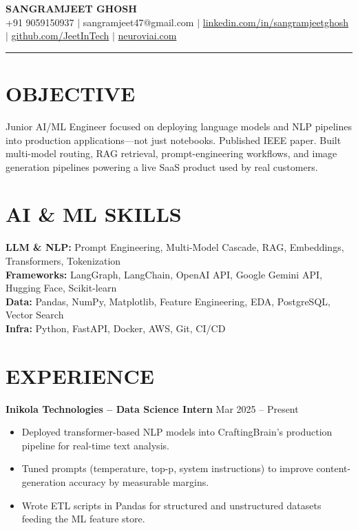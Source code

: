 \documentclass[10pt]{article}
\begin{document}
\begin{center}
{\Large \textbf{SANGRAMJEET GHOSH}} \\[2pt]
{\small +91 9059150937 $|$ sangramjeet47@gmail.com $|$
\href{https://www.linkedin.com/in/sangramjeetghosh}{linkedin.com/in/sangramjeetghosh} $|$
\href{https://github.com/JeetInTech}{github.com/JeetInTech} $|$
\href{https://neuroviai.com}{neuroviai.com}}
\end{center}

\noindent\rule{\textwidth}{0.4pt}

\section*{OBJECTIVE}
Junior AI/ML Engineer focused on deploying language models and NLP pipelines into production applications---not just notebooks. Published IEEE paper. Built multi-model routing, RAG retrieval, prompt-engineering workflows, and image generation pipelines powering a live SaaS product used by real customers.

\section*{AI \& ML SKILLS}
\textbf{LLM \& NLP:} Prompt Engineering, Multi-Model Cascade, RAG, Embeddings, Transformers, Tokenization \\
\textbf{Frameworks:} LangGraph, LangChain, OpenAI API, Google Gemini API, Hugging Face, Scikit-learn \\
\textbf{Data:} Pandas, NumPy, Matplotlib, Feature Engineering, EDA, PostgreSQL, Vector Search \\
\textbf{Infra:} Python, FastAPI, Docker, AWS, Git, CI/CD

\section*{EXPERIENCE}
\textbf{Inikola Technologies -- Data Science Intern} \hfill Mar 2025 -- Present
\begin{itemize}
\item Deployed transformer-based NLP models into CraftingBrain's production pipeline for real-time text analysis.
\item Tuned prompts (temperature, top-p, system instructions) to improve content-generation accuracy by measurable margins.
\item Wrote ETL scripts in Pandas for structured and unstructured datasets feeding the ML feature store.
\end{itemize}
\end{document}
